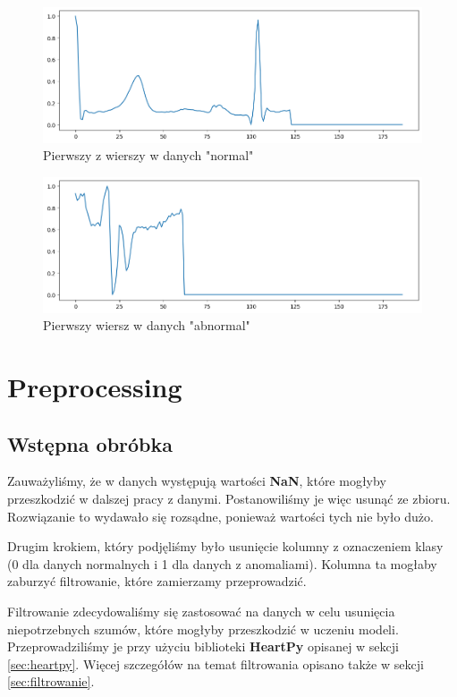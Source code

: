 \documentclass[12pt,a4paper]{article}
\begin{document}
\begin{figure}[h]
    \centering
    \includegraphics[width=1\linewidth]{pierwszy_wiersz_normal.png}
    \caption{Pierwszy z wierszy w danych "normal"}
    \label{fig:pierwszy-wiersz-normal}
\end{figure}

\begin{figure}[h]
    \centering
    \includegraphics[width=1\linewidth]{pierwszy_wiersz_abnormal.png}
    \caption{Pierwszy wiersz w danych "abnormal"}
    \label{fig:pierwszy-wiersz-abnormal}
\end{figure}


\section{Preprocessing}
\subsection{Wstępna obróbka}

Zauważyliśmy, że w danych występują wartości \textbf{NaN}, które mogłyby przeszkodzić w dalszej pracy z danymi. Postanowiliśmy je więc usunąć ze zbioru. Rozwiązanie to wydawało się rozsądne, ponieważ wartości tych nie było dużo.

Drugim krokiem, który podjęliśmy było usunięcie kolumny z oznaczeniem klasy (0 dla danych normalnych i 1 dla danych z anomaliami). Kolumna ta mogłaby zaburzyć filtrowanie, które zamierzamy przeprowadzić. 

Filtrowanie zdecydowaliśmy się zastosować na danych w celu usunięcia niepotrzebnych szumów, które mogłyby przeszkodzić w uczeniu modeli. Przeprowadziliśmy je przy użyciu biblioteki \textbf{HeartPy} opisanej w sekcji \ref{sec:heartpy}. Więcej szczegółów na temat filtrowania opisano także w sekcji \ref{sec:filtrowanie}.
\end{document}
